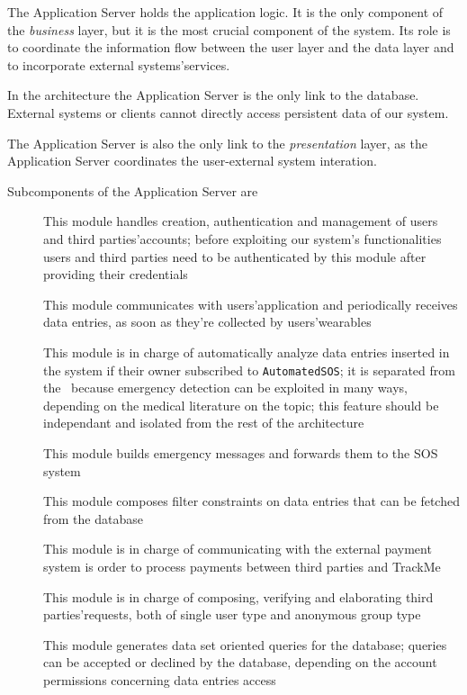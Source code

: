 \documentclass[../DD0.tex]{subfiles}
\begin{document}
        The Application Server holds the application logic. It is the only component of the \textit{business} layer, but it is the most crucial component of the system. Its role is to coordinate the information flow between the user layer and the data layer and to incorporate external systems'services.

        In the architecture the Application Server is the only link to the database. External systems or clients cannot directly access persistent data of our system.

        The Application Server is also the only link to the \textit{presentation} layer, as the Application Server  coordinates the user-external system interation.

        Subcomponents of the Application Server are
        \begin{description}
          \item[\AccountManager] This module handles creation, authentication and management of users and third parties'accounts; before exploiting our system's functionalities users and third parties need to be authenticated by this module after providing their credentials
          \item[\DataCollector] This module communicates with users'application and periodically receives data entries, as soon as they're collected by users'wearables
          \item[\EmergencyDetector] This module is in charge of automatically analyze data entries inserted in the system if their owner subscribed to \texttt{AutomatedSOS}; it is separated from the \DataCollector\ because emergency detection can be exploited in many ways, depending on the medical literature on the topic; this feature should be independant and isolated from the rest of the architecture
          \item[\EmergencyDispatcher] This module builds emergency messages and forwards them to the SOS system
          \item[\FilterManager] This module composes filter constraints on data entries that can be fetched from the database
          \item[\PaymentGateway] This module is in charge of communicating with the external payment system is order to process payments between third parties and TrackMe
          \item[\RequestManager] This module is in charge of composing, verifying and elaborating third parties'requests, both of single user type and anonymous group type
          \item[\SetBuilder] This module generates data set oriented queries for the database; queries can be accepted or declined by the database, depending on the account permissions concerning data entries access
        \end{description}
\end{document}
